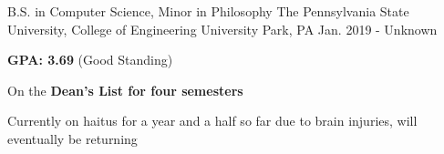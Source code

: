

\begin{cventries}

  \cventry
    {B.S. in Computer Science, Minor in Philosophy} %
    {The Pennsylvania State University, College of Engineering} %
    {University Park, PA} %
    {Jan. 2019 - Unknown} %
    {
      \begin{cvitems} %
        \item {\textbf{GPA: 3.69} (Good Standing)}
        \item {On the \textbf{Dean's List for four semesters}}
        \item {Currently on haitus for a year and a half so far due to brain injuries, will eventually be returning}
      \end{cvitems}
    }

\end{cventries}
